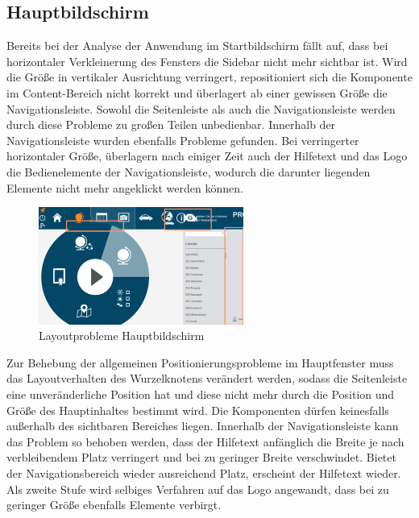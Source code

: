 \subsection{Hauptbildschirm}
Bereits bei der Analyse der Anwendung im Startbildschirm fällt auf, dass bei horizontaler Verkleinerung des Fensters die Sidebar nicht mehr sichtbar ist. Wird die Größe in vertikaler Ausrichtung verringert, repositioniert sich die Komponente im Content-Bereich nicht korrekt und überlagert ab einer gewissen Größe die Navigationsleiste. Sowohl die Seitenleiste als auch die Navigationsleiste werden durch diese Probleme zu großen Teilen unbedienbar. Innerhalb der Navigationsleiste wurden ebenfalls Probleme gefunden. Bei verringerter horizontaler Größe, überlagern nach einiger Zeit auch der Hilfetext und das Logo die Bedienelemente der Navigationsleiste, wodurch die darunter liegenden Elemente nicht mehr angeklickt werden können.\par
\begin{figure}[H]
 \centering
 \includegraphics[width=0.6\textwidth]{grafiken/radial_bug.png}
 \caption{Layoutprobleme Hauptbildschirm}
 \label{fig:layoutMainScreen}
\end{figure}
Zur Behebung der allgemeinen Positionierungsprobleme im Hauptfenster muss das Layoutverhalten des Wurzelknotens verändert werden, sodass die Seitenleiste eine unveränderliche Position hat und diese nicht mehr durch die Position und Größe des Hauptinhaltes bestimmt wird. Die Komponenten dürfen keinesfalls außerhalb des sichtbaren Bereiches liegen. Innerhalb der Navigationsleiste kann das Problem so behoben werden, dass der Hilfetext anfänglich die Breite je nach verbleibendem Platz verringert und bei zu geringer Breite verschwindet. Bietet der Navigationsbereich wieder ausreichend Platz, erscheint der Hilfetext wieder. Als zweite Stufe wird selbiges Verfahren auf das Logo angewandt, dass bei zu geringer Größe ebenfalls Elemente verbirgt.\par
